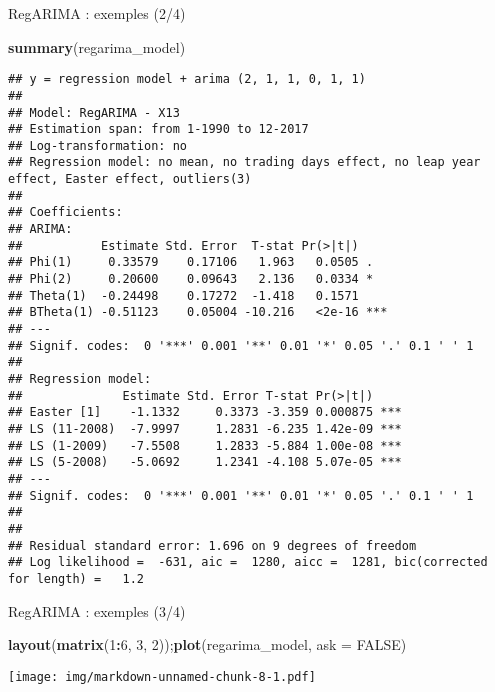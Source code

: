 \documentclass[10pt,xcolor=table,color={dvipsnames,usenames},ignorenonframetext,usepdftitle=false,french]{beamer}
\newenvironment{Shaded}{\begin{snugshade}}{\end{snugshade}}
\newcommand{\DataTypeTok}[1]{\textcolor[rgb]{0.13,0.29,0.53}{#1}}
\newcommand{\DecValTok}[1]{\textcolor[rgb]{0.00,0.00,0.81}{#1}}
\newcommand{\KeywordTok}[1]{\textcolor[rgb]{0.13,0.29,0.53}{\textbf{#1}}}
\newcommand{\NormalTok}[1]{#1}
\newcommand{\OperatorTok}[1]{\textcolor[rgb]{0.81,0.36,0.00}{\textbf{#1}}}
\newcommand{\OtherTok}[1]{\textcolor[rgb]{0.56,0.35,0.01}{#1}}
\begin{document}
\begin{frame}[fragile]{RegARIMA : exemples (2/4)}
\protect\hypertarget{regarima-exemples-24}{}

\footnotesize

\begin{Shaded}
\begin{Highlighting}[]
\KeywordTok{summary}\NormalTok{(regarima_model)}
\end{Highlighting}
\end{Shaded}

\begin{verbatim}
## y = regression model + arima (2, 1, 1, 0, 1, 1)
## 
## Model: RegARIMA - X13
## Estimation span: from 1-1990 to 12-2017
## Log-transformation: no
## Regression model: no mean, no trading days effect, no leap year effect, Easter effect, outliers(3)
## 
## Coefficients:
## ARIMA: 
##           Estimate Std. Error  T-stat Pr(>|t|)    
## Phi(1)     0.33579    0.17106   1.963   0.0505 .  
## Phi(2)     0.20600    0.09643   2.136   0.0334 *  
## Theta(1)  -0.24498    0.17272  -1.418   0.1571    
## BTheta(1) -0.51123    0.05004 -10.216   <2e-16 ***
## ---
## Signif. codes:  0 '***' 0.001 '**' 0.01 '*' 0.05 '.' 0.1 ' ' 1
## 
## Regression model: 
##              Estimate Std. Error T-stat Pr(>|t|)    
## Easter [1]    -1.1332     0.3373 -3.359 0.000875 ***
## LS (11-2008)  -7.9997     1.2831 -6.235 1.42e-09 ***
## LS (1-2009)   -7.5508     1.2833 -5.884 1.00e-08 ***
## LS (5-2008)   -5.0692     1.2341 -4.108 5.07e-05 ***
## ---
## Signif. codes:  0 '***' 0.001 '**' 0.01 '*' 0.05 '.' 0.1 ' ' 1
## 
## 
## Residual standard error: 1.696 on 9 degrees of freedom
## Log likelihood =  -631, aic =  1280, aicc =  1281, bic(corrected for length) =   1.2
\end{verbatim}

\end{frame}

\begin{frame}[fragile]{RegARIMA : exemples (3/4)}
\protect\hypertarget{regarima-exemples-34}{}

\begin{Shaded}
\begin{Highlighting}[]
\KeywordTok{layout}\NormalTok{(}\KeywordTok{matrix}\NormalTok{(}\DecValTok{1}\OperatorTok{:}\DecValTok{6}\NormalTok{, }\DecValTok{3}\NormalTok{, }\DecValTok{2}\NormalTok{));}\KeywordTok{plot}\NormalTok{(regarima_model, }\DataTypeTok{ask =} \OtherTok{FALSE}\NormalTok{)}
\end{Highlighting}
\end{Shaded}

\texttt{[image: img/markdown-unnamed-chunk-8-1.pdf]}

\end{frame}
\end{document}
